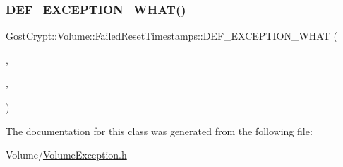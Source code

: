 \subsubsection{\texorpdfstring{D\+E\+F\+\_\+\+E\+X\+C\+E\+P\+T\+I\+O\+N\+\_\+\+W\+H\+A\+T()}{DEF\_EXCEPTION\_WHAT()}}
{\footnotesize\ttfamily Gost\+Crypt\+::\+Volume\+::\+Failed\+Reset\+Timestamps\+::\+D\+E\+F\+\_\+\+E\+X\+C\+E\+P\+T\+I\+O\+N\+\_\+\+W\+H\+AT (\begin{DoxyParamCaption}\item[{\hyperlink{class_gost_crypt_1_1_volume_1_1_failed_reset_timestamps}{Failed\+Reset\+Timestamps}}]{,  }\item[{\hyperlink{class_gost_crypt_1_1_volume_1_1_volume_exception}{Volume\+Exception}}]{,  }\item[{\char`\"{}Failed to reset the timestamp of the volume file.\char`\"{}}]{ }\end{DoxyParamCaption})}



The documentation for this class was generated from the following file\+:\begin{DoxyCompactItemize}
\item 
Volume/\hyperlink{_volume_exception_8h}{Volume\+Exception.\+h}\end{DoxyCompactItemize}
